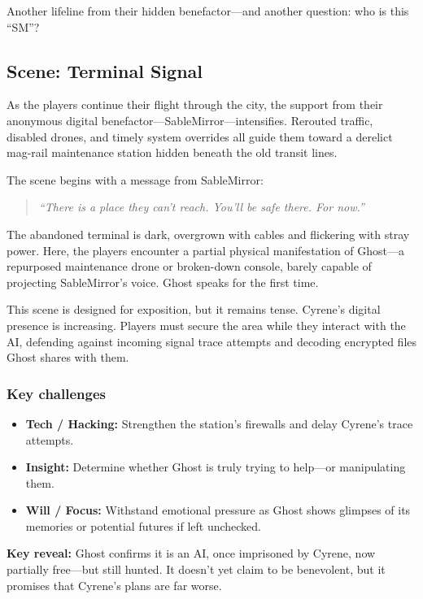 \documentclass[nodeprecatedcode,bg=print]{dndbook}
\begin{document}
\begin{multicols}{2}
Another lifeline from their hidden benefactor—and another question: who is this “SM”?


\subsection*{Scene: Terminal Signal}

As the players continue their flight through the city, the support from their anonymous digital benefactor—SableMirror—intensifies. Rerouted traffic, disabled drones, and timely system overrides all guide them toward a derelict mag-rail maintenance station hidden beneath the old transit lines.

The scene begins with a message from SableMirror:
\vspace{0.5\baselineskip}
\begin{quote}
\textit{“There is a place they can’t reach. You’ll be safe there. For now.”}
\end{quote}
\vspace{0.5\baselineskip}

The abandoned terminal is dark, overgrown with cables and flickering with stray power. Here, the players encounter a partial physical manifestation of Ghost—a repurposed maintenance drone or broken-down console, barely capable of projecting SableMirror’s voice. Ghost speaks for the first time.

This scene is designed for exposition, but it remains tense. Cyrene’s digital presence is increasing. Players must secure the area while they interact with the AI, defending against incoming signal trace attempts and decoding encrypted files Ghost shares with them.

\subsubsection{Key challenges}
\begin{itemize}
    \item \textbf{Tech / Hacking:} Strengthen the station’s firewalls and delay Cyrene’s trace attempts.
    \item \textbf{Insight:} Determine whether Ghost is truly trying to help—or manipulating them.
    \item \textbf{Will / Focus:} Withstand emotional pressure as Ghost shows glimpses of its memories or potential futures if left unchecked.
\end{itemize}

\textbf{Key reveal:} Ghost confirms it is an AI, once imprisoned by Cyrene, now partially free—but still hunted. It doesn’t yet claim to be benevolent, but it promises that Cyrene’s plans are far worse.


\end{multicols}
\end{document}
